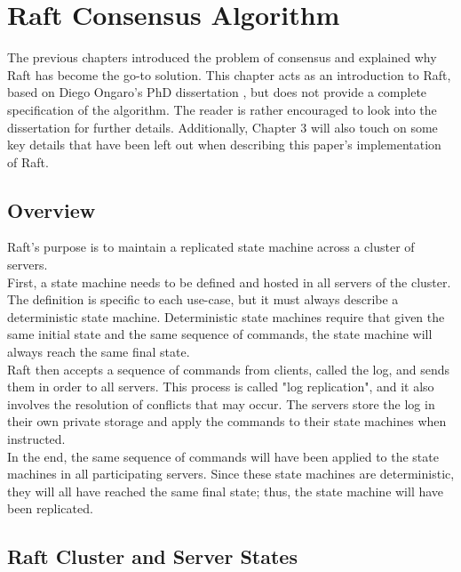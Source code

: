 \chapter{Raft Consensus Algorithm}

The previous chapters introduced the problem of consensus and explained why Raft has become the go-to solution. This chapter acts as an introduction to Raft, based on Diego Ongaro's PhD dissertation \cite{raft}, but does not provide a complete specification of the algorithm. The reader is rather encouraged to look into the dissertation for further details. Additionally, Chapter 3 will also touch on some key details that have been left out when describing this paper's implementation of Raft.

\section{Overview}

Raft's purpose is to maintain a replicated state machine across a cluster of servers.\\

First, a state machine needs to be defined and hosted in all servers of the cluster. The definition is specific to each use-case, but it must always describe a deterministic state machine. Deterministic state machines require that given the same initial state and the same sequence of commands, the state machine will always reach the same final state.\\

Raft then accepts a sequence of commands from clients, called the log, and sends them in order to all servers. This process is called "log replication", and it also involves the resolution of conflicts that may occur. The servers store the log in their own private storage and apply the commands to their state machines when instructed.\\

In the end, the same sequence of commands will have been applied to the state machines in all participating servers. Since these state machines are deterministic, they will all have reached the same final state; thus, the state machine will have been replicated.\\

\section{Raft Cluster and Server States}

